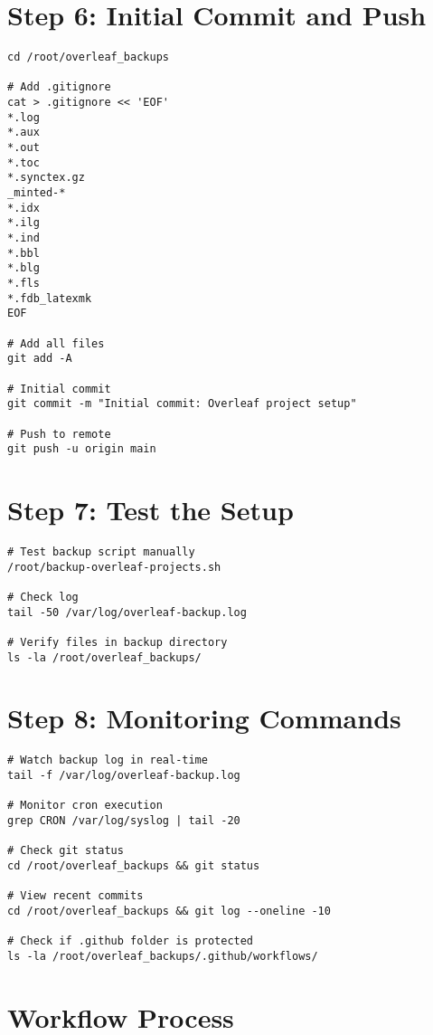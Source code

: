 \section{Step 6: Initial Commit and Push}

\begin{verbatim}
cd /root/overleaf_backups

# Add .gitignore
cat > .gitignore << 'EOF'
*.log
*.aux
*.out
*.toc
*.synctex.gz
_minted-*
*.idx
*.ilg
*.ind
*.bbl
*.blg
*.fls
*.fdb_latexmk
EOF

# Add all files
git add -A

# Initial commit
git commit -m "Initial commit: Overleaf project setup"

# Push to remote
git push -u origin main
\end{verbatim}

\section{Step 7: Test the Setup}

\begin{verbatim}
# Test backup script manually
/root/backup-overleaf-projects.sh

# Check log
tail -50 /var/log/overleaf-backup.log

# Verify files in backup directory
ls -la /root/overleaf_backups/
\end{verbatim}

\section{Step 8: Monitoring Commands}

\begin{verbatim}
# Watch backup log in real-time
tail -f /var/log/overleaf-backup.log

# Monitor cron execution
grep CRON /var/log/syslog | tail -20

# Check git status
cd /root/overleaf_backups && git status

# View recent commits
cd /root/overleaf_backups && git log --oneline -10

# Check if .github folder is protected
ls -la /root/overleaf_backups/.github/workflows/
\end{verbatim}

\section{Workflow Process}

